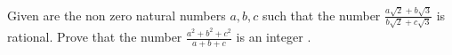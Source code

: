 Given are the non zero natural numbers $a,b,c$ such that the number $\frac{a\sqrt2+b\sqrt3}{b\sqrt2+c\sqrt3}$ is rational.
Prove that the number $\frac{a^2+b^2+c^2}{a+b+c}$ is an integer .